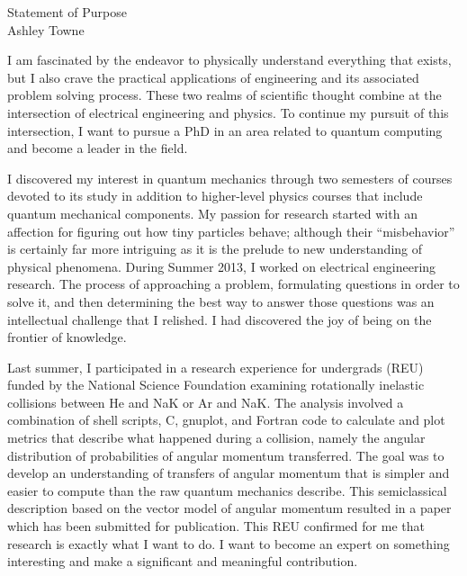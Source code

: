 \setlength{\oddsidemargin}{0in}
\setlength{\evensidemargin}{0in}
\setlength{\textwidth}{6.5in}
\setlength{\topmargin}{-.3in}
\setlength{\textheight}{9in}
\pagestyle{empty}



\begin{center}
{\Large Statement of Purpose} \\[.3in]
{\large Ashley Towne}
\end{center}

\vspace*{.5in}
{I am fascinated by the endeavor to physically understand everything that
    exists, but I also crave the practical applications of engineering and its
    associated problem solving process. These two realms of scientific thought
    combine at the intersection of electrical engineering and physics. To
    continue my pursuit of this intersection, I want to pursue a PhD in an area
    related to quantum computing and become a leader in the field. 

    I discovered my interest in quantum mechanics through two semesters of
    courses devoted to its study in addition to higher-level physics courses
    that include quantum mechanical components. My passion for research started
    with an affection for figuring out how tiny particles behave; although
    their “misbehavior” is certainly far more intriguing as it is the prelude
    to new understanding of physical phenomena. During Summer 2013, I worked on
    electrical engineering research. The process of approaching a problem,
    formulating questions in order to solve it, and then determining the best
    way to answer those questions was an intellectual challenge that I
    relished. I had discovered the joy of being on the frontier of knowledge.

    Last summer, I participated in a research experience for undergrads (REU)
    funded by the National Science Foundation examining rotationally inelastic
    collisions between He and NaK or Ar and NaK. The analysis involved a
    combination of shell scripts, C, gnuplot, and Fortran code to calculate and
    plot metrics that describe what happened during a collision, namely the
    angular distribution of probabilities of angular momentum transferred.  The
    goal was to develop an understanding of transfers of angular momentum that
    is simpler and easier to compute than the raw quantum mechanics describe.
    This semiclassical description based on the vector model of angular
    momentum resulted in a paper which has been submitted for publication.
    This REU confirmed for me that research is exactly what I want to do.  I
    want to become an expert on something interesting and make a significant
    and meaningful contribution.

}

